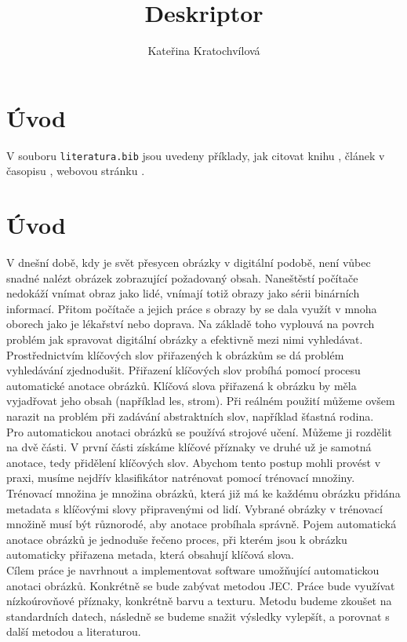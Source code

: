 \documentclass[czech,BP]{thesiskiv}
\author{Kateřina Kratochvílová}
\title{Deskriptor}
\begin{document}
%
\maketitle
\tableofcontents

\chapter{Úvod}
V souboru \texttt{literatura.bib} jsou uvedeny příklady, jak citovat knihu \cite{KnuthAOCP2}, článek v časopisu \cite{Hoare1961}, webovou stránku \cite{Graphics2D}.


\chapter{Úvod}
V dnešní době, kdy je svět přesycen obrázky v digitální podobě, není vůbec snadné nalézt obrázek zobrazující požadovaný obsah. Naneštěstí počítače nedokáží vnímat obraz jako lidé, vnímají totiž obrazy jako sérii binárních informací. Přitom počítače a jejich práce s obrazy by se dala využít v mnoha oborech jako je lékařství nebo doprava. Na základě toho vyplouvá na povrch problém jak spravovat digitální obrázky a efektivně mezi nimi vyhledávat. Prostřednictvím klíčových slov přiřazených k obrázkům se dá problém vyhledávání zjednodušit. Přiřazení klíčových slov probíhá pomocí procesu automatické anotace obrázků. Klíčová slova přiřazená k obrázku by měla vyjadřovat jeho obsah (například les, strom). Při reálném použití můžeme ovšem narazit na problém při zadávání abstraktních slov, například šťastná rodina.  
\\
Pro automatickou anotaci obrázků se používá strojové učení. Můžeme ji rozdělit na dvě části. V první části získáme klíčové příznaky ve druhé už je samotná anotace, tedy přidělení klíčových slov. Abychom tento postup mohli provést v praxi, musíme nejdřív klasifikátor natrénovat pomocí trénovací množiny. Trénovací množina je množina obrázků, která již má ke každému obrázku přidána metadata s klíčovými slovy připravenými od lidí. Vybrané obrázky v trénovací množině musí být různorodé, aby anotace probíhala správně. Pojem automatická anotace obrázků je jednoduše řečeno proces, při kterém jsou k obrázku automaticky přiřazena metada, která obsahují klíčová slova. 
\\
Cílem práce je navrhnout a implementovat software umožňující automatickou anotaci obrázků. Konkrétně se bude zabývat metodou JEC. Práce bude využívat nízkoúrovňové příznaky, konkrétně barvu a texturu. Metodu budeme zkoušet na standardních datech, následně se budeme snažit výsledky vylepšít, a porovnat s další metodou a literaturou.
\end{document}
